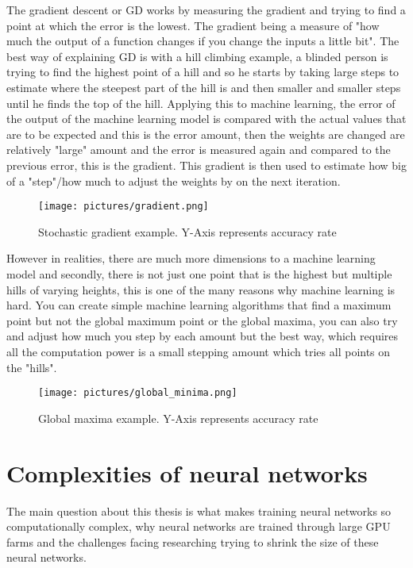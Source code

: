 \documentclass[a4paper,oneside,phd,etd]{BYUPhys}
\begin{document}
The gradient descent or GD works by measuring the gradient and trying to find a point at which the error is the lowest. The gradient being a measure of "how much the output of a function changes if you change the inputs a little bit"\cite{towards-data-science}.
The best way of explaining GD is with a hill climbing example, a blinded person is trying to find the highest point of a hill and so he starts by taking large steps to estimate where the steepest part of the hill is and then smaller and smaller steps until he finds the top of the hill. Applying this to machine learning, the error of the output of the machine learning model is compared with the actual values that are to be expected and this is the error amount, then the weights are changed are relatively "large" amount and the error is measured again and compared to the previous error, this is the gradient. This gradient is then used to estimate how big of a "step"/how much to adjust the weights by on the next iteration.
\begin{figure}[H]
\centering
\texttt{[image: pictures/gradient.png]}
\caption{Stochastic gradient example.
Y-Axis represents accuracy rate}
\label{fig:gradient}
\end{figure}

However in realities, there are much more dimensions to a machine learning model and secondly, there is not just one point that is the highest but multiple hills of varying heights, this is one of the many reasons why machine learning is hard. You can create simple machine learning algorithms that find a maximum point but not the global maximum point or the global maxima, you can also try and adjust how much you step by each amount but the best way, which requires all the computation power is a small stepping amount which tries all points on the "hills". 
\begin{figure}[H]
\centering
\texttt{[image: pictures/global\_minima.png]}
\caption{Global maxima example.
Y-Axis represents accuracy rate}
\label{fig:global_minima}
\end{figure}

\section{Complexities of neural networks}
The main question about this thesis is what makes training neural networks so computationally complex, why neural networks are trained through large GPU farms and the challenges facing researching trying to shrink the size of these neural networks.
\end{document}
